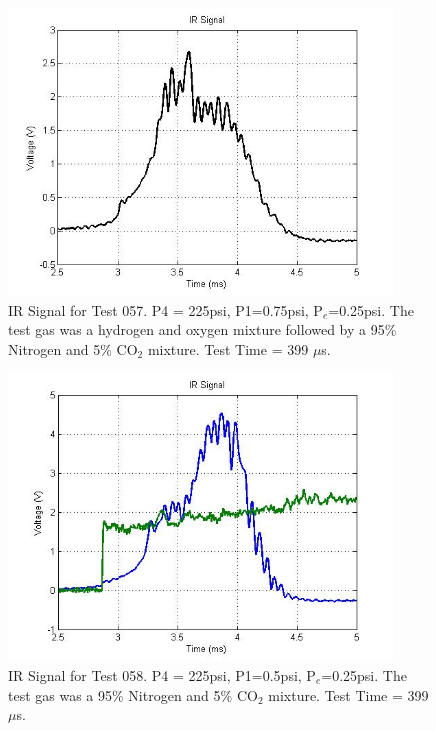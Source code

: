 \begin{figure}
\centering
\includegraphics[height = 3in]{Figures/H2.jpg}
\caption[IR Signal for Test 046]{IR Signal for Test 057. P4 = 225psi, P1=0.75psi, P$_e$=0.25psi. The test gas was a hydrogen and oxygen mixture followed by a 95\% Nitrogen and 5\% CO$_2$ mixture. Test Time = 399 $\mu$s.}
\label{fig:IRTrace2}
\end{figure}

\begin{figure}
\centering
\includegraphics[height = 3in]{Figures/H2andCo2.jpg}
\caption[IR Signal for Test 046]{IR Signal for Test 058. P4 = 225psi, P1=0.5psi, P$_e$=0.25psi. The test gas was a 95\% Nitrogen and 5\% CO$_2$ mixture. Test Time = 399 $\mu$s.}
\label{fig:IRTrace3}
\end{figure}

